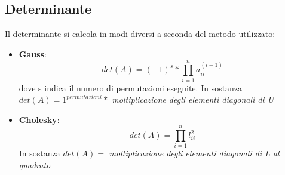 \subsection{Determinante}
\label{Determinante}
Il determinante si calcola in modi diversi a seconda del metodo utilizzato:
\begin{itemize}
\item \textbf{Gauss}: $$det(A) = (-1)^s * \prod_{i=1}^{n} a^{(i-1)}_{ii}$$ dove s indica il numero di permutazioni eseguite. In sostanza \\$det(A) = 1^{permutazioni} *$ \textit{moltiplicazione degli elementi diagonali di U}
\item \textbf{Cholesky}: $$det(A) = \prod_{i=1}^{n} l^2_{ii}$$ In sostanza $det(A) =$ \textit{moltiplicazione degli elementi diagonali di L al quadrato}
\end{itemize}

